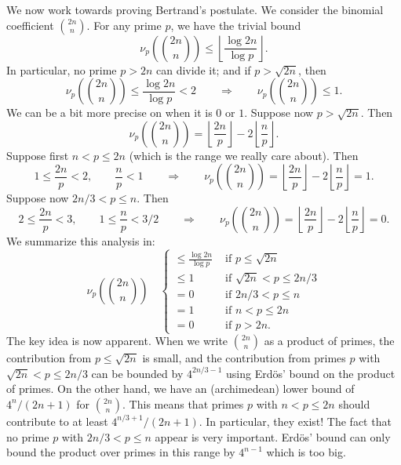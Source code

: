\documentclass{article}
\begin{document}
\vspace{5pt}
We now work towards proving Bertrand's postulate. We consider the binomial coefficient $\displaystyle\binom{2n}{n}$. For any prime $p$, we have the trivial bound
$$\nu_p\left(\binom{2n}{n}\right) \leq \left\lfloor\frac{\log 2n}{\log p}\right\rfloor.$$
In particular, no prime $p>2n$ can divide it; and if $p>\sqrt{2n}$, then
$$\nu_p\left(\binom{2n}{n}\right) \leq \frac{\log 2n}{\log p} < 2\qquad\Longrightarrow\qquad \nu_p\left(\binom{2n}{n}\right) \leq 1.$$
We can be a bit more precise on when it is $0$ or $1$. Suppose now $p>\sqrt{2n}$. Then
$$\nu_p\left(\binom{2n}{n}\right) = \left\lfloor\frac{2n}{p}\right\rfloor - 2\left\lfloor\frac{n}{p}\right\rfloor.$$
Suppose first $n< p \leq 2n$ (which is the range we really care about). Then
$$1\leq \frac{2n}{p} < 2,\qquad \frac{n}{p} < 1 \qquad \Longrightarrow \qquad \nu_p\left(\binom{2n}{n}\right) = \left\lfloor\frac{2n}{p}\right\rfloor - 2\left\lfloor\frac{n}{p}\right\rfloor = 1.$$
Suppose now $2n/3 < p \leq n$. Then 
$$2\leq \frac{2n}{p} < 3,\qquad 1\leq \frac{n}{p} < 3/2 \qquad \Longrightarrow \qquad \nu_p\left(\binom{2n}{n}\right) = \left\lfloor\frac{2n}{p}\right\rfloor - 2\left\lfloor\frac{n}{p}\right\rfloor = 0.$$
We summarize this analysis in:
$$\nu_p\left(\binom{2n}{n}\right)\quad\begin{cases}
    \leq \displaystyle\frac{\log 2n}{\log p}&\mbox{ if }p \leq \sqrt{2n}\\
    \leq 1 &\mbox{ if }\sqrt{2n} < p \leq 2n/3\\
    =0&\mbox{ if }2n/3 < p \leq n\\
    =1&\mbox{ if }n < p \leq 2n\\
    =0&\mbox{ if }p > 2n.
\end{cases}$$
The key idea is now apparent. When we write $\binom{2n}{n}$ as a product of primes, the contribution from $p\leq\sqrt{2n}$ is small, and the contribution from primes $p$ with $\sqrt{2n} < p\leq 2n/3$ can be bounded by $4^{2n/3-1}$ using Erd\"{o}s' bound on the product of primes. On the other hand, we have an (archimedean) lower bound of $4^n/(2n+1)$ for $\binom{2n}{n}$. This means that primes $p$ with $n < p\leq 2n$ should contribute to at least $4^{n/3+1}/(2n+1)$. In particular, they exist! The fact that no prime $p$ with $2n/3<p\leq n$ appear is very important. Erd\"{o}s' bound can only bound the product over primes in this range by $4^{n-1}$ which is too big.
\end{document}
